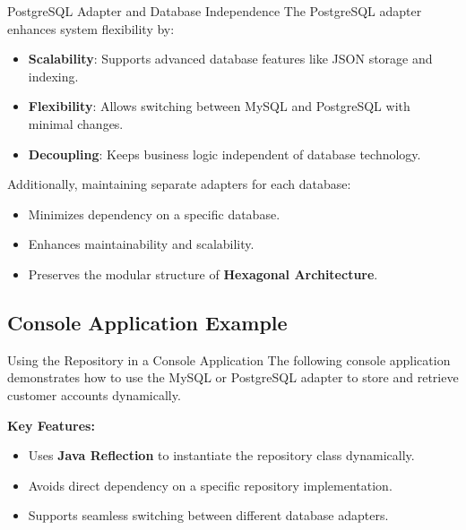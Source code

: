 \documentclass[aspectratio=169, table]{beamer}
\begin{document}
\begin{frame}[fragile]{\LARGE{PostgreSQL Adapter and Database Independence}}
	\vspace{20pt}
	The PostgreSQL adapter enhances system flexibility by:
	\begin{itemize}
		\item \textbf{Scalability}: Supports advanced database features like JSON storage and indexing.
		\item \textbf{Flexibility}: Allows switching between MySQL and PostgreSQL with minimal changes.
		\item \textbf{Decoupling}: Keeps business logic independent of database technology.
	\end{itemize}
	
	Additionally, maintaining separate adapters for each database:
	\begin{itemize}
		\item Minimizes dependency on a specific database.
		\item Enhances maintainability and scalability.
		\item Preserves the modular structure of \textbf{Hexagonal Architecture}.
	\end{itemize}
\end{frame}


\subsection{Console Application Example}

\begin{frame}[fragile]{Using the Repository in a Console Application}
	\vspace{20pt}
	The following console application demonstrates how to use the MySQL or PostgreSQL adapter to store and retrieve customer accounts dynamically.
	
	\textbf{Key Features:}
	\begin{itemize}
		\item Uses \textbf{Java Reflection} to instantiate the repository class dynamically.
		\item Avoids direct dependency on a specific repository implementation.
		\item Supports seamless switching between different database adapters.
	\end{itemize}
\end{frame}
\end{document}
